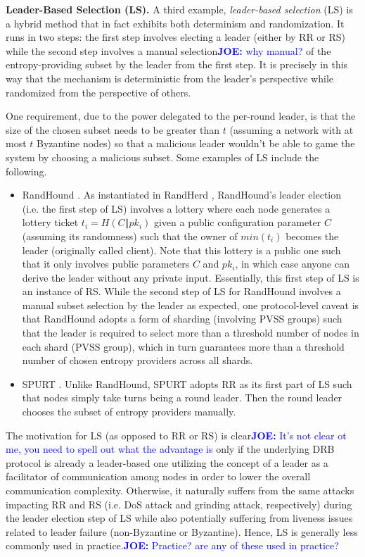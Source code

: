 \documentclass[letterpaper,twocolumn,10pt]{article}
\theoremstyle{definition}
\theoremstyle{remark}
\newcommand{\joenote}[1]{\textcolor{blue}{\textbf{JOE:} #1}}
\begin{document}
\noindent\textbf{Leader-Based Selection (LS).} A third example, \textit{leader-based selection} (LS) is a hybrid method that in fact exhibits both determinism and randomization. It runs in two steps: the first step involves electing a leader (either by RR or RS) while the second step involves a manual selection\joenote{why manual?} of the entropy-providing subset by the leader from the first step. It is precisely in this way that the mechanism is deterministic from the leader's perspective while randomized from the perspective of others.

One requirement, due to the power delegated to the per-round leader, is that the size of the chosen subset needs to be greater than $t$ (assuming a network with at most $t$ Byzantine nodes) so that a malicious leader wouldn't be able to game the system by choosing a malicious subset. Some examples of LS include the following.
\begin{itemize}
\item RandHound \cite{syta2017scalable}. As instantiated in RandHerd \cite{syta2017scalable}, RandHound's leader election (i.e. the first step of LS) involves a lottery where each node generates a lottery ticket $t_i = H(C \mathbin\Vert pk_i)$ given a public configuration parameter $C$ (assuming its randomness) such that the owner of $min(t_i)$ becomes the leader (originally called client). Note that this lottery is a public one such that it only involves public parameters $C$ and $pk_i$, in which case anyone can derive the leader without any private input. Essentially, this first step of LS is an instance of RS. While the second step of LS for RandHound involves a manual subset selection by the leader as expected, one protocol-level caveat is that RandHound adopts a form of sharding (involving PVSS groups) such that the leader is required to select more than a threshold number of nodes in each shard (PVSS group), which in turn guarantees more than a threshold number of chosen entropy providers across all shards.
\item SPURT \cite{das2021spurt}. Unlike RandHound, SPURT adopts RR as its first part of LS such that nodes simply take turns being a round leader. Then the round leader chooses the subset of entropy providers manually.
\end{itemize}

The motivation for LS (as opposed to RR or RS) is clear\joenote{It's not clear ot me, you need to spell out what the advantage is} only if the underlying DRB protocol is already a leader-based one utilizing the concept of a leader as a facilitator of communication among nodes in order to lower the overall communication complexity. Otherwise, it naturally suffers from the same attacks impacting RR and RS (i.e. DoS attack and grinding attack, respectively) during the leader election step of LS while also potentially suffering from liveness issues related to leader failure (non-Byzantine or Byzantine). Hence, LS is generally less commonly used in practice.\joenote{Practice? are any of these used in practice?}
\end{document}
